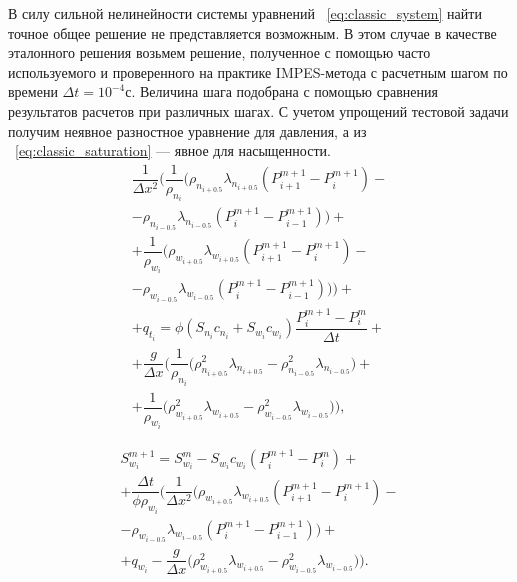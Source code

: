 В силу сильной нелинейности системы уравнений ~\eqref{eq:classic_system} найти точное общее решение не представляется возможным.
В этом случае в качестве эталонного решения возьмем решение, полученное с помощью часто используемого и проверенного на практике IMPES-метода с расчетным шагом по
времени $\Delta t = 10^{-4}\text{с}$. Величина шага подобрана с помощью сравнения результатов расчетов при различных шагах.
С учетом упрощений тестовой задачи получим неявное разностное уравнение для давления,
а из ~\eqref{eq:classic_saturation} --- явное для насыщенности.
\begin{equation} \label{eq:scheme_p}
 \begin{gathered} 
  \dfrac{1}{\Delta x^2} \bigg(\dfrac{1}{\rho_{n_i}} \big( \rho_{n_{i+0.5}} \lambda_{n_{i+0.5}} (P_{i+1}^{m+1} - P_i^{m+1}) -\\
  - \rho_{n_{i-0.5}} \lambda_{n_{i-0.5}} (P_i^{m+1} - P_{i-1}^{m+1})\big) + \\
  + \dfrac{1}{\rho_{w_i}} \big( \rho_{w_{i+0.5}} \lambda_{w_{i+0.5}} (P_{i+1}^{m+1} - P_i^{m+1}) -\\
  - \rho_{w_{i-0.5}} \lambda_{w_{i-0.5}} (P_i^{m+1} - P_{i-1}^{m+1})\big)\bigg) + \\
  + q_{t_i} = \phi(S_{n_i}c_{n_i}+S_{w_i}c_{w_i}) \dfrac{P_i^{m+1} - P_i^m}{\Delta t} +\\
  + \dfrac{g}{\Delta x} \bigg(\dfrac{1}{\rho_{n_i}} \big( \rho_{n_{i+0.5}}^2 \lambda_{n_{i+0.5}} 
  - \rho_{n_{i-0.5}}^2 \lambda_{n_{i-0.5}} \big) + \\
  + \dfrac{1}{\rho_{w_i}} \big( \rho_{w_{i+0.5}}^2 \lambda_{w_{i+0.5}} 
  - \rho_{w_{i-0.5}}^2 \lambda_{w_{i-0.5}} \big)\bigg),
 \end{gathered}
\end{equation} \bigskip

\begin{equation} \label{eq:scheme_s}
 \begin{gathered} 
  S_{w_i}^{m+1} = S_{w_i}^{m} - S_{w_i}c_{w_i} (P_i^{m+1} - P_i^m) + \\
  + \dfrac{\Delta t}{\phi\rho_{w_i}}\Bigg( \dfrac{1}{\Delta x^2} \bigg(\rho_{w_{i+0.5}} \lambda_{w_{i+0.5}} (P_{i+1}^{m+1} - P_i^{m+1}) -\\
  - \rho_{w_{i-0.5}} \lambda_{w_{i-0.5}} (P_i^{m+1} - P_{i-1}^{m+1}) \bigg) +\\
  + q_{w_i} - \dfrac{g}{\Delta x} \bigg(\rho_{w_{i+0.5}}^2 \lambda_{w_{i+0.5}} - \rho_{w_{i-0.5}}^2 \lambda_{w_{i-0.5}} \bigg) \Bigg).
 \end{gathered}
\end{equation}

